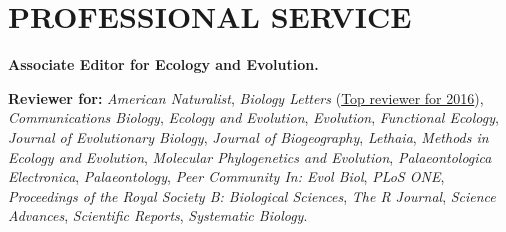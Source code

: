 \documentclass[10pt,a4paper]{article}
\begin{document}
{%


\bigskip


\section{PROFESSIONAL SERVICE}

\raggedright\textbf{Associate Editor for Ecology and Evolution.}

\raggedright\textbf{Reviewer for:} %
\textit{American Naturalist},
\textit{Biology Letters} (\href{http://blogs.royalsociety.org/publishing/biology-letters-top-reviewers-from-2016/}{Top reviewer for 2016}),
\textit{Communications Biology},
\textit{Ecology and Evolution},
\textit{Evolution},
\textit{Functional Ecology},
\textit{Journal of Evolutionary Biology},
\textit{Journal of Biogeography},
\textit{Lethaia},
\textit{Methods in Ecology and Evolution},
\textit{Molecular Phylogenetics and Evolution},
\textit{Palaeontologica Electronica},
\textit{Palaeontology},
\textit{Peer Community In: Evol Biol},
\textit{PLoS ONE},
\textit{Proceedings of the Royal Society B: Biological Sciences},
\textit{The R Journal},
\textit{Science Advances},
\textit{Scientific Reports},
\textit{Systematic Biology}.

}
\end{document}

